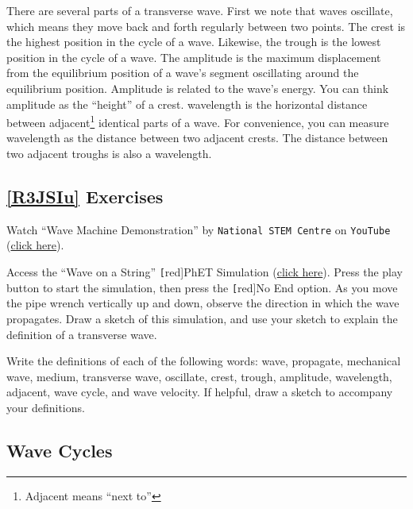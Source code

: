 \documentclass[main.tex]{subfiles}
\begin{document}
There are several parts of a transverse wave. First we note that waves \gls{oscillate}, which means they move back and forth regularly between two points. The \gls{crest} is the highest position in the cycle of a wave. Likewise, the \gls{trough} is the lowest position in the cycle of a wave. The \gls{amplitude} is the maximum displacement from the equilibrium position of a wave's segment oscillating around the equilibrium position. Amplitude is related to the wave's energy. You can think amplitude as the ``height'' of a crest. \Gls{wavelength} is the horizontal distance between \gls{adjacent}\footnote{Adjacent means ``next to''} identical parts of a wave. For convenience, you can measure wavelength as the distance between two adjacent crests. The distance between two adjacent troughs is also a wavelength. 

\subsection*{\ref{R3JSIu} Exercises}

\begin{exercise}
    Watch ``Wave Machine Demonstration'' by \texttt{National STEM Centre} on \texttt{YouTube} (\href{https://youtu.be/VE520z_ugcU}{click here}).
\end{exercise}

\begin{exercise}
    Access the ``Wave on a String'' \texttt[red]{PhET Simulation} (\href{https://phet.colorado.edu/en/simulation/wave-on-a-string}{click here}). Press the play button to start the simulation, then press the \texttt[red]{No End} option. As you move the pipe wrench vertically up and down, observe the direction in which the wave propagates. Draw a sketch of this simulation, and use your sketch to explain the definition of a \gls{transverse wave}.
\end{exercise}

\begin{exercise}
    Write the definitions of each of the following words: wave, propagate, mechanical wave, medium, transverse wave, oscillate, crest, trough, amplitude, wavelength, adjacent, wave cycle, and wave velocity. If helpful, draw a sketch to accompany your definitions.
\end{exercise}

\cyanhrule


\subsection{Wave Cycles}\label{ZAl8Xb}
\end{document}
